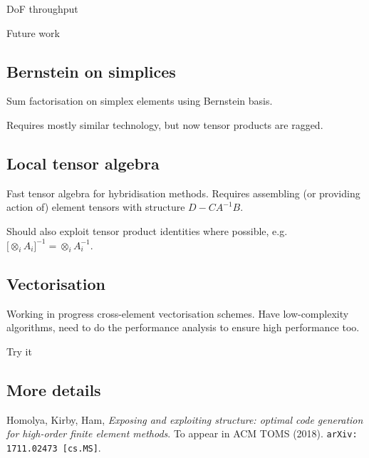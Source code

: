 \documentclass[a0paper,portrait]{baposter}
\newcommand{\fitCurve}[4]{%
  \pgfplotstablegetelem{#2}{C}\of#1
  \pgfmathsetmacro{#3}{\pgfplotsretval}
  \pgfplotstablegetelem{#2}{a}\of#1
  \pgfmathsetmacro{\a}{\pgfplotsretval}
  \pgfplotstablegetelem{#2}{b}\of#1
  \pgfmathsetmacro{\b}{\pgfplotsretval}
  \addplot[densely dashdotted,domain=\a:\b] {#4};
}
\begin{document}
\begin{poster}
\begin{posterbox}[name=curl-curl, column=3, below=flop-scaling,
    span=3]{DoF throughput}
\begin{center}
  \end{center}
  \end{posterbox}

  \begin{posterbox}[name=future, column=0, below=rules,
    span=3]{Future work}
    \subsection*{Bernstein on simplices}
    \vspace{-0.5em}
      Sum factorisation on simplex elements using Bernstein basis.

      Requires mostly similar technology, but now tensor products are
      ragged.
      \vspace{-\baselineskip}
      \subsection*{Local tensor algebra}
      \vspace{-0.5em}
      Fast tensor algebra for hybridisation methods.  Requires
      assembling (or providing action of) element tensors with
      structure $D - C A^{-1} B$.

      Should also exploit tensor product identities where possible,
      e.g.~$\big[\otimes_i A_i\big]^{-1} = \otimes_i A_i^{-1}$.
      \vspace{-\baselineskip}
      \subsection*{Vectorisation}
      \vspace{-0.5em}
      Working in progress cross-element vectorisation schemes.  Have
      low-complexity algorithms, need to do the performance analysis
      to ensure high performance too.
  \end{posterbox}    
  \begin{posterbox}[name=try, column=3, below=curl-curl,
    span=3]{Try it}
    \subsection*{More details}
    \vspace{-0.5em}
    Homolya, Kirby, Ham, \emph{Exposing and exploiting structure:
      optimal code generation for high-order finite element
      methods}. To appear in ACM TOMS (2018).
    \texttt{arXiv:\,1711.02473\,[cs.MS]}.
    \vspace{-\baselineskip}

\end{posterbox}
\end{poster}
\end{document}
